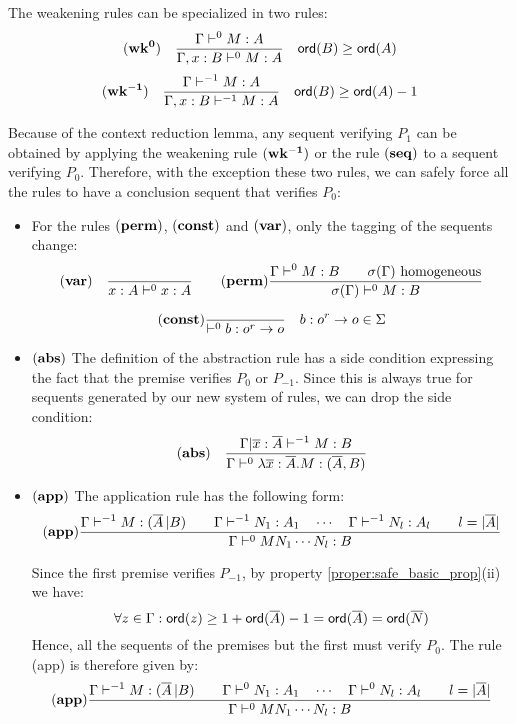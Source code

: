 The weakening rules can be specialized in two rules:
$$ \mathbf{(wk^{0})} \quad  \frac{\displaystyle \Gamma \vdash^{0} M : A}{\Gamma , x : B \vdash^{0} M : A} \quad {\sf ord}(B) \geq {\sf ord}(A) $$
$$ \mathbf{(wk^{-1})} \quad  \frac{\displaystyle \Gamma \vdash^{-1} M : A}{\Gamma , x : B \vdash^{-1} M : A} \quad {\sf ord}(B) \geq {\sf ord}(A) -1$$

Because of the context reduction lemma, any sequent verifying $P_1$ can be obtained
by applying the weakening rule $\mathbf{(wk^{-1})}$ or the rule $\mathbf{(seq)}$ to a sequent
verifying $P_0$. Therefore, with the exception these two rules, we can safely force all the rules to
have a conclusion sequent that verifies $P_0$:
\begin{itemize}
\item For the rules $\mathbf{(perm)}$, $\mathbf{(const)}$ and $\mathbf{(var)}$, only the tagging of the sequents change:
$$ \mathbf{(var)} \quad  \frac{\displaystyle }{x : A\vdash^{0} x : A}
\qquad
  \mathbf{(perm)} \frac{\displaystyle 
      { \Gamma \vdash^0 M:B \qquad \sigma(\Gamma)  } \hbox{ homogeneous}
    }{ \sigma(\Gamma) \vdash^0 M : B }
$$

$$ \mathbf{(const)}
    \frac{\displaystyle }{ \vdash^0 b : o^r \rightarrow o} \quad b : o^r \rightarrow o \in \Sigma
$$

\item $\mathbf{(abs)}$ The definition of the abstraction rule has a side condition
expressing the fact that the premise verifies $P_0$ or $P_{-1}$. Since this is always true for sequents
generated by our new system of rules, we can drop the side condition:
$$ \mathbf{(abs)} \quad  \frac{\displaystyle \Gamma | \overline{x} : \overline{A} \vdash^{-1} M : B}{\Gamma  \vdash^{0} \lambda \overline{x} : \overline{A} . M : (\overline{A},B)}$$


\item $\mathbf{(app)}$ The application rule has the following form:
$$ \mathbf{(app)}
    \frac{\displaystyle 
        { \Gamma \vdash^{-1} M : (\overline{A} \, | B)
        \qquad
        \Gamma \vdash^{-1} N_1 : A_1 \quad \cdots \quad \Gamma \vdash^{-1} N_{l} : A_l \qquad l = |\overline{A}|
        }
    }{
        \Gamma \vdash^0 M N_1 \cdots N_{l} : B
    }
$$

Since the first premise verifies $P_{-1}$, by property \ref{proper:safe_basic_prop}(ii) we have:
$$\forall z \in \Gamma : {\sf ord}(z) \geq 1 + {\sf ord}(\overline{A}) -1 = {\sf ord}(\overline{A}) = {\sf ord}(\overline{N})$$
Hence, all the sequents of the premises but the first must verify $P_0$. The rule (app) is therefore given by:
$$ \mathbf{(app)}
    \frac{\displaystyle 
        { \Gamma \vdash^{-1} M : (\overline{A} \, | B)
        \qquad
        \Gamma \vdash^0 N_1 : A_1 \quad \cdots \quad \Gamma \vdash^0 N_{l} : A_l \qquad l = |\overline{A}|
        }
    }{
        \Gamma \vdash^0 M N_1 \cdots N_{l} : B
      }
$$


\end{itemize}

